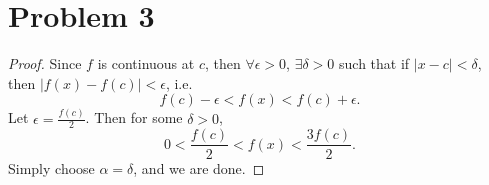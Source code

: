 \documentclass{article}
\begin{document}
\section*{Problem 3}
\begin{proof}
	Since $f$ is continuous at $c$, then $\forall \epsilon > 0 $, $\exists \delta > 0$ such that if $|x - c| < \delta$, then $|f(x) - f(c)| < \epsilon$, i.e.
	\begin{equation}
		f(c) - \epsilon < f(x) < f(c) + \epsilon.
	\end{equation}
	Let $\epsilon = \frac{f(c)}{2}$. Then for some $\delta > 0$,
	\begin{equation}
		0 < \frac{f(c)}{2} < f(x) < \frac{3 f(c)}{2}.
	\end{equation}
	Simply choose $\alpha = \delta$, and we are done.
\end{proof}
\end{document}
